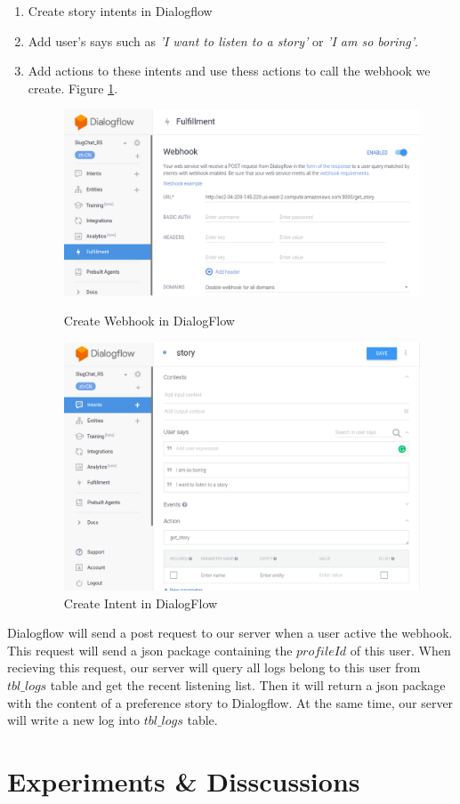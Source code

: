 \documentclass[sigconf]{acmart}
\begin{document}
\begin{enumerate}
\item Create story intents in Dialogflow
\item Add user's says such as \emph{'I want to listen to a story'} or \emph{'I am so boring'}. 
\item Add actions to these intents and use thess actions to call the webhook we create. Figure \ref{fig:create_intent}.
\begin{figure}
\includegraphics[width = .45\textwidth]{create_webhook.png}
\caption{Create Webhook in DialogFlow}
\label{fig:create_webhook}
\includegraphics[width = .45\textwidth]{create_intent.png}
\caption{Create Intent in DialogFlow}
\label{fig:create_intent}
\end{figure}
\end{enumerate}
Dialogflow will send a post request to our server when a user active the webhook. This request will send a json package containing the $profileId$ of this user. When recieving this request, our server will query all logs belong to this user from $tbl\_logs$ table and get the recent listening list. Then it will return a json package with the content of a preference story to Dialogflow. At the same time, our server will write a new log into $tbl\_logs$ table.

\section{Experiments \& Disscussions}
\end{document}
